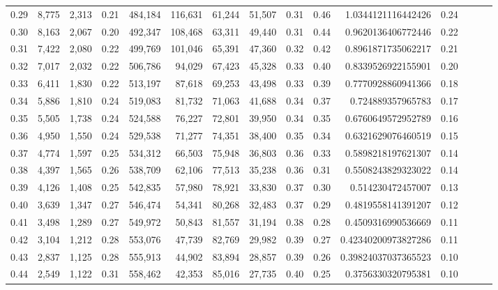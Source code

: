 \begin{tabular}{rrrrrrrrrrrrrrr}
0.29 &   8,775 &  2,313 &  0.21 &  484,184 &  116,631 &   61,244 &   51,507 &  0.31 &  0.46 &    1.0344121116442426 &      0.24 \\
0.30 &   8,163 &  2,067 &  0.20 &  492,347 &  108,468 &   63,311 &   49,440 &  0.31 &  0.44 &    0.9620136406772446 &      0.22 \\
0.31 &   7,422 &  2,080 &  0.22 &  499,769 &  101,046 &   65,391 &   47,360 &  0.32 &  0.42 &    0.8961871735062217 &      0.21 \\
0.32 &   7,017 &  2,032 &  0.22 &  506,786 &   94,029 &   67,423 &   45,328 &  0.33 &  0.40 &    0.8339526922155901 &      0.20 \\
0.33 &   6,411 &  1,830 &  0.22 &  513,197 &   87,618 &   69,253 &   43,498 &  0.33 &  0.39 &    0.7770928860941366 &      0.18 \\
0.34 &   5,886 &  1,810 &  0.24 &  519,083 &   81,732 &   71,063 &   41,688 &  0.34 &  0.37 &     0.724889357965783 &      0.17 \\
0.35 &   5,505 &  1,738 &  0.24 &  524,588 &   76,227 &   72,801 &   39,950 &  0.34 &  0.35 &    0.6760649572952789 &      0.16 \\
0.36 &   4,950 &  1,550 &  0.24 &  529,538 &   71,277 &   74,351 &   38,400 &  0.35 &  0.34 &    0.6321629076460519 &      0.15 \\
0.37 &   4,774 &  1,597 &  0.25 &  534,312 &   66,503 &   75,948 &   36,803 &  0.36 &  0.33 &    0.5898218197621307 &      0.14 \\
0.38 &   4,397 &  1,565 &  0.26 &  538,709 &   62,106 &   77,513 &   35,238 &  0.36 &  0.31 &    0.5508243829323022 &      0.14 \\
0.39 &   4,126 &  1,408 &  0.25 &  542,835 &   57,980 &   78,921 &   33,830 &  0.37 &  0.30 &     0.514230472457007 &      0.13 \\
0.40 &   3,639 &  1,347 &  0.27 &  546,474 &   54,341 &   80,268 &   32,483 &  0.37 &  0.29 &    0.4819558141391207 &      0.12 \\
0.41 &   3,498 &  1,289 &  0.27 &  549,972 &   50,843 &   81,557 &   31,194 &  0.38 &  0.28 &    0.4509316990536669 &      0.11 \\
0.42 &   3,104 &  1,212 &  0.28 &  553,076 &   47,739 &   82,769 &   29,982 &  0.39 &  0.27 &   0.42340200973827286 &      0.11 \\
0.43 &   2,837 &  1,125 &  0.28 &  555,913 &   44,902 &   83,894 &   28,857 &  0.39 &  0.26 &   0.39824037037365523 &      0.10 \\
0.44 &   2,549 &  1,122 &  0.31 &  558,462 &   42,353 &   85,016 &   27,735 &  0.40 &  0.25 &    0.3756330320795381 &      0.10 \\

\end{tabular}
